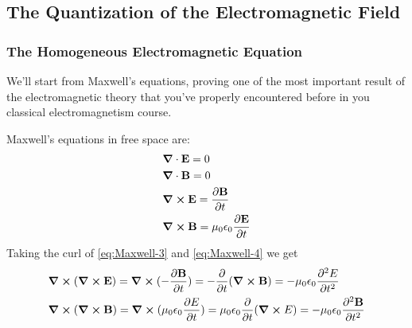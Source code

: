 \documentclass[english, a4paper, 12pt, twoside]{article}
\numberwithin{equation}{section} %
\begin{document}
\subsection{The Quantization of the Electromagnetic Field}
\subsubsection{The Homogeneous Electromagnetic Equation}
We'll start from Maxwell's equations, proving one of the most important result of the electromagnetic theory that you've properly encountered before in you classical electromagnetism course.

Maxwell's equations in free space are:
\begin{subequations}
    \label{eq:optim}
    \begin{align}
        &\grad \cdot \textbf{E} = 0 \label{eq:Maxwell-1}\\
        &\grad \cdot \textbf{B} = 0 \label{eq:Maxwell-2}\\
        &\grad \cross \textbf{E} = \frac{\partial\textbf{B}}{\partial t} \label{eq:Maxwell-3}\\
        &\grad \cross \textbf{B} = \mu_0 \epsilon_0 \frac{\partial\textbf{E}}{\partial t} \label{eq:Maxwell-4}
    \end{align}
\end{subequations}
Taking the curl of \ref{eq:Maxwell-3} and \ref{eq:Maxwell-4} we get
\begin{subequations} 
\label{eq:curl-}
    \begin{align}
        &\curl{(\curl{\textbf{E}})} 
        = \curl{(-\frac{\partial \textbf{B}}{\partial t})} 
        = -\frac{\partial}{\partial t}(\curl{\textbf{B}})
        = - \mu_0 \epsilon_0 \frac{\partial^2 E}{\partial t^2} 
        \label{eq:curl-E}\\
        &\curl{(\curl{\textbf{B}})} 
        = \curl{(\mu_0 \epsilon_0 \frac{\partial E}{\partial t})} 
        = \mu_0 \epsilon_0\frac{\partial}{\partial t}(\curl{E}) 
        = - \mu_0 \epsilon_0 \frac{\partial^2 \textbf{B}}{\partial t^2} 
        \label{eq:curl-B}
    \end{align}
\end{subequations}
   
\end{document}
